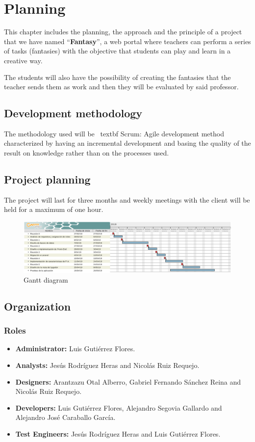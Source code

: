 \chapter{Planning}
This chapter includes the planning, the approach and the principle of a project that we have named ``\textbf{Fantasy}'', a web portal where teachers can perform a series of tasks (fantasies) with the objective that students can play and learn in a creative way.

The students will also have the possibility of creating the fantasies that the teacher sends them as work and then they will be evaluated by said professor.

\section{Development methodology}
The methodology used will be \ textbf {Scrum}: Agile development method characterized by having an incremental development and basing the quality of the result on knowledge rather than on the processes used.

\section{Project planning}
The project will last for three months and weekly meetings with the client will be held for a maximum of one hour.
\begin{figure}[h]
	\centering
	\includegraphics[scale=0.42]{Gantt.png}
	\caption{Gantt diagram}
	\label{Gantt diagram}
\end{figure}

\section{Organization}
\subsection{Roles}
\begin{itemize}
	\item \textbf{Administrator:} Luis Gutiérrez Flores.
	\item \textbf{Analysts:} Jesús Rodríguez Heras and Nicolás Ruiz Requejo.
	\item \textbf{Designers:} Arantzazu Otal Alberro, Gabriel Fernando Sánchez Reina and Nicolás Ruiz Requejo.
	\item \textbf{Developers:} Luis Gutiérrez Flores, Alejandro Segovia Gallardo and Alejandro José Caraballo García.
	\item \textbf{Test Engineers:} Jesús Rodríguez Heras and Luis Gutiérrez Flores.
\end{itemize}

